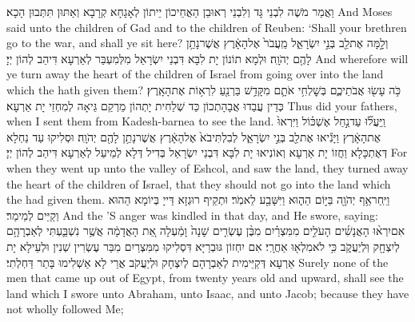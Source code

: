 {וַאֲמַר מֹשֶׁה לִבְנֵי גָּד וְלִבְנֵי רְאוּבֵן הַאֲחֵיכוֹן יֵיתוֹן לְאָגָחָא קְרָבָא וְאַתּוּן תִּתְּבוּן הָכָא׃}
{And Moses said unto the children of Gad and to the children of Reuben: ‘Shall your brethren go to the war, and shall ye sit here?}{}
{וְלָ֣מָּה  אֶת\maqqaf לֵ֖ב בְּנֵ֣י יִשְׂרָאֵ֑ל מֵֽעֲבֹר֙ אֶל\maqqaf הָאָ֔רֶץ אֲשֶׁר\maqqaf נָתַ֥ן לָהֶ֖ם יְהֹוָֽה׃}
{וּלְמָא תוֹנוֹן יָת לִבָּא דִּבְנֵי יִשְׂרָאֵל מִלְּמִעְבַּר לְאַרְעָא דִּיהַב לְהוֹן יְיָ׃}
{And wherefore will ye turn away the heart of the children of Israel from going over into the land which the \lord\space hath given them?}{}
{כֹּ֥ה עָשׂ֖וּ אֲבֹתֵיכֶ֑ם בְּשׇׁלְחִ֥י אֹתָ֛ם מִקָּדֵ֥שׁ בַּרְנֵ֖עַ לִרְא֥וֹת אֶת\maqqaf הָאָֽרֶץ׃}
{כְּדֵין עֲבַדוּ אֲבָהָתְכוֹן כַּד שְׁלַחִית יָתְהוֹן מֵרְקַם גֵּיאָה לְמִחְזֵי יָת אַרְעָא׃}
{Thus did your fathers, when I sent them from Kadesh-barnea to see the land.}{}
{וַֽיַּעֲל֞וּ עַד\maqqaf נַ֣חַל אֶשְׁכּ֗וֹל וַיִּרְאוּ֙ אֶת\maqqaf הָאָ֔רֶץ וַיָּנִ֕יאוּ אֶת\maqqaf לֵ֖ב בְּנֵ֣י יִשְׂרָאֵ֑ל לְבִלְתִּי\maqqaf בֹא֙ אֶל\maqqaf הָאָ֔רֶץ אֲשֶׁר\maqqaf נָתַ֥ן לָהֶ֖ם יְהֹוָֽה׃}
{וּסְלִיקוּ עַד נַחְלָא דְּאֶתְכָּלָא וַחֲזוֹ יָת אַרְעָא וְאוֹנִיאוּ יָת לִבָּא דִּבְנֵי יִשְׂרָאֵל בְּדִיל דְּלָא לְמֵיעַל לְאַרְעָא דִּיהַב לְהוֹן יְיָ׃}
{For when they went up unto the valley of Eshcol, and saw the land, they turned away the heart of the children of Israel, that they should not go into the land which the \lord\space had given them.}{}
{וַיִּֽחַר\maqqaf אַ֥ף יְהֹוָ֖ה בַּיּ֣וֹם הַה֑וּא וַיִּשָּׁבַ֖ע לֵאמֹֽר׃}
{וּתְקֵיף רוּגְזָא דַּייָ בְּיוֹמָא הַהוּא וְקַיֵּים לְמֵימַר׃}
{And the \lord’S anger was kindled in that day, and He swore, saying:}{}
{אִם\maqqaf יִרְא֨וּ הָאֲנָשִׁ֜ים הָעֹלִ֣ים מִמִּצְרַ֗יִם מִבֶּ֨ן עֶשְׂרִ֤ים שָׁנָה֙ וָמַ֔עְלָה אֵ֚ת הָאֲדָמָ֔ה אֲשֶׁ֥ר נִשְׁבַּ֛עְתִּי לְאַבְרָהָ֥ם לְיִצְחָ֖ק וּֽלְיַעֲקֹ֑ב כִּ֥י לֹא\maqqaf מִלְא֖וּ אַחֲרָֽי׃}
{אִם יִחְזוֹן גּוּבְרַיָּא דִּסְלִיקוּ מִמִּצְרַיִם מִבַּר עֶשְׂרִין שְׁנִין וּלְעֵילָא יָת אַרְעָא דְּקַיֵּימִית לְאַבְרָהָם לְיִצְחָק וּלְיַעֲקֹב אֲרֵי לָא אַשְׁלִימוּ בָּתַר דַּחְלְתִי׃}
{Surely none of the men that came up out of Egypt, from twenty years old and upward, shall see the land which I swore unto Abraham, unto Isaac, and unto Jacob; because they have not wholly followed Me;}{}
